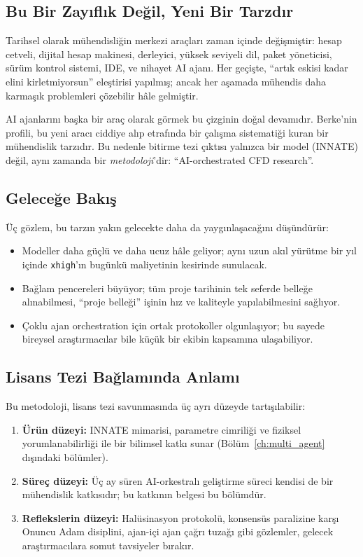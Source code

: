 \subsection{Bu Bir Zayıflık Değil, Yeni Bir Tarzdır}

Tarihsel olarak mühendisliğin merkezi araçları zaman içinde
değişmiştir: hesap cetveli, dijital hesap makinesi, derleyici,
yüksek seviyeli dil, paket yöneticisi, sürüm kontrol sistemi, IDE,
ve nihayet AI ajanı. Her geçişte, ``artık eskisi kadar elini
kirletmiyorsun'' eleştirisi yapılmış; ancak her aşamada mühendis
daha karmaşık problemleri çözebilir hâle gelmiştir.

AI ajanlarını başka bir araç olarak görmek bu çizginin doğal devamıdır.
Berke'nin profili, bu yeni aracı ciddiye alıp etrafında bir çalışma
sistematiği kuran bir mühendislik tarzıdır. Bu nedenle bitirme tezi
çıktısı yalnızca bir model (INNATE) değil, aynı zamanda bir
\emph{metodoloji}'dir: ``AI-orchestrated CFD research''.

\subsection{Geleceğe Bakış}

Üç gözlem, bu tarzın yakın gelecekte daha da yaygınlaşacağını
düşündürür:

\begin{itemize}
  \item Modeller daha güçlü ve daha ucuz hâle geliyor; aynı uzun
        akıl yürütme bir yıl içinde \texttt{xhigh}'ın bugünkü maliyetinin
        kesirinde sunulacak.
  \item Bağlam pencereleri büyüyor; tüm proje tarihinin tek seferde
        belleğe alınabilmesi, ``proje belleği'' işinin hız ve kaliteyle
        yapılabilmesini sağlıyor.
  \item Çoklu ajan orchestration için ortak protokoller
        olgunlaşıyor; bu sayede bireysel araştırmacılar bile küçük
        bir ekibin kapsamına ulaşabiliyor.
\end{itemize}

\subsection{Lisans Tezi Bağlamında Anlamı}

Bu metodoloji, lisans tezi savunmasında üç ayrı düzeyde tartışılabilir:

\begin{enumerate}
  \item \textbf{Ürün düzeyi:} INNATE mimarisi, parametre cimriliği
        ve fiziksel yorumlanabilirliği ile bir bilimsel katkı sunar
        (Bölüm~\ref{ch:multi_agent} dışındaki bölümler).
  \item \textbf{Süreç düzeyi:} Üç ay süren AI-orkestralı geliştirme
        süreci kendisi de bir mühendislik katkısıdır; bu katkının
        belgesi bu bölümdür.
  \item \textbf{Reflekslerin düzeyi:} Halüsinasyon protokolü,
        konsensüs paralizine karşı Onuncu Adam disiplini, ajan-içi
        ajan çağrı tuzağı gibi gözlemler, gelecek araştırmacılara
        somut tavsiyeler bırakır.
\end{enumerate}

